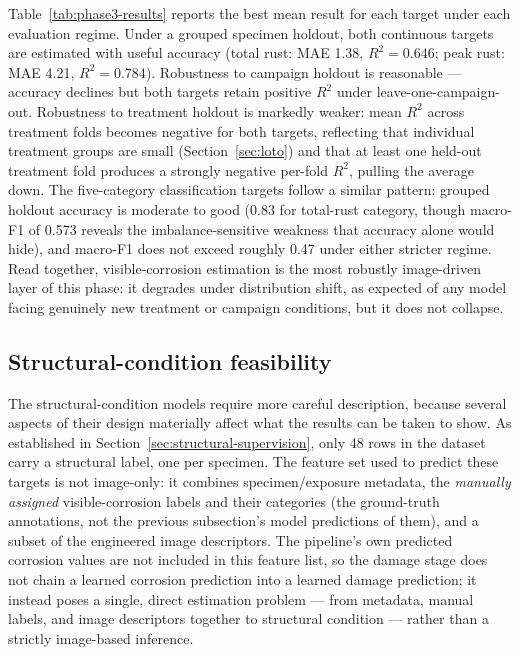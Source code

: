 Table~\ref{tab:phase3-results} reports the best mean result for each target
under each evaluation regime. Under a grouped specimen holdout, both
continuous targets are estimated with useful accuracy (total rust: MAE 1.38,
$R^2=0.646$; peak rust: MAE 4.21, $R^2=0.784$). Robustness to campaign
holdout is reasonable — accuracy declines but both targets retain positive
$R^2$ under leave-one-campaign-out. Robustness to treatment holdout is
markedly weaker: mean $R^2$ across treatment folds becomes negative for both
targets, reflecting that individual treatment groups are small
(Section~\ref{sec:loto}) and that at least one held-out treatment fold
produces a strongly negative per-fold $R^2$, pulling the average down. The
five-category classification targets follow a similar pattern: grouped
holdout accuracy is moderate to good (0.83 for total-rust category, though
macro-F1 of 0.573 reveals the imbalance-sensitive weakness that accuracy
alone would hide), and macro-F1 does not exceed roughly 0.47 under either
stricter regime. Read together, visible-corrosion estimation is the most
robustly image-driven layer of this phase: it degrades under distribution
shift, as expected of any model facing genuinely new treatment or campaign
conditions, but it does not collapse.

\subsection{Structural-condition feasibility}
\label{sec:phase3-structural}

The structural-condition models require more careful description, because
several aspects of their design materially affect what the results can be
taken to show. As established in Section~\ref{sec:structural-supervision},
only 48 rows in the dataset carry a structural label, one per specimen.
The feature set used to predict these targets is not image-only: it
combines specimen/exposure metadata, the \emph{manually assigned} visible-corrosion
labels and their categories (the ground-truth annotations, not the previous
subsection's model predictions of them), and a subset of the engineered
image descriptors. The pipeline's own predicted corrosion values are not
included in this feature list, so the damage stage does not chain a learned
corrosion prediction into a learned damage prediction; it instead poses a
single, direct estimation problem — from metadata, manual labels, and image
descriptors together to structural condition — rather than a
strictly image-based inference.

